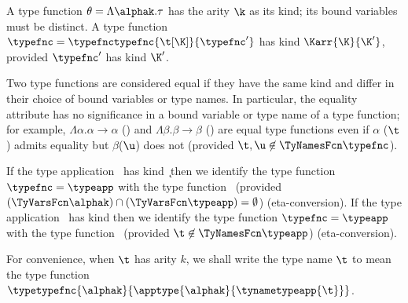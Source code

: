 \label{tyfcn-lab}
A type function $\theta=\Lambda\alphak.\tau$
 has the arity $\k$ as its kind; its bound variables must
be distinct.
A type function $\typefnc=\typefnctypefnc{\t[\K]}{\typefnc'}$
 has kind $\Karr{\K}{\K'}$, provided $\typefnc'$ has kind $\K'$.

Two type functions are considered equal if they have the same kind
and differ in their choice of bound variables or
type names.
In particular, the equality attribute has no significance in a 
bound variable or type name of a type function;
for example, $\Lambda\alpha.\alpha\to\alpha$ 
(\typefnctypefnc{\t[\K]}{\apptypeapp{\t}{\typefnc}})
and $\Lambda\beta.\beta\to\beta$
 (\typefnctypefnc{\u[\K]}{\apptypeapp{\u}{\typefnc}}) are equal type functions
even if $\alpha$ ($\t$) admits equality but $\beta$($\u$) does not (provided
$\t,\u \not \in \TyNamesFcn \typefnc$).

If the type application \typeapp\ has kind \k\ then we
identify the type function $\typefnc = \typeapp$ with the type function
\typetypefnc{\alphak}{\apptype{\alphak}{\typeapp}}\ 
(provided $(\TyVarsFcn \alphak) \cap (\TyVarsFcn \typeapp) = \emptyset$) (eta-conversion).
If the type application \typeapp\ has kind \Karr{\K}{\K'} then we
identify the type function $\typefnc = \typeapp$ with the type function
\typefnctypefnc{\t[\K]}{\typeapptypefnc{\apptypeapp{\typeapp}{\typeapptypefnc{\t}}}}\
 (provided $\t\not \in \TyNamesFcn \typeapp$) (eta-conversion).

For convenience, when $\t$ has arity $k$, we 
shall write the type name $\t$ to mean
the type function $\typetypefnc{\alphak}{\apptype{\alphak}{\tynametypeapp{\t}}}$.

